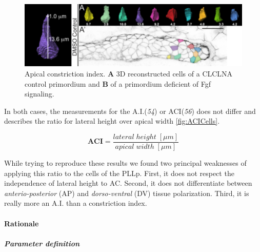 \documentclass[11pt,singlespacinge,twoside]{reedthesis} %
\begin{document}
\begin{figure}

{\centering \includegraphics[width=0.75\linewidth]{figure/02-MaMo/ACI/Harding} 

}

\caption[Apical constriction index]{Apical constriction index. \textbf{A} 3D reconstructed cells of a CLCLNA control primordium and \textbf{B} of a primordium deficient of Fgf signaling.}\label{fig:ACHard}
\end{figure}
\noindent In both cases, the measurements for the A.I.(\emph{54}) or ACI(\emph{56}) does not differ and describes the ratio for lateral height over apical width \ref{fig:ACICells}.

\[\mathbf{ACI} = \frac{lateral\;height\;[\mu m]}{apical\;width\;[\mu m]}\]

\noindent While trying to reproduce these results we found two principal weaknesses of applying this ratio to the cells of the PLLp. First, it does not respect the independence of lateral height to AC. Second, it does not differentiate between \emph{anterio-posterior} (AP) and \emph{dorso-ventral} (DV) tissue polarization. Third, it is really more an A.I. than a constriction index.

\hypertarget{rationale}{%
\paragraph{Rationale}\label{rationale}}

\hypertarget{ACI-param}{%
\subparagraph{Parameter definition}\label{ACI-param}}
\end{document}
